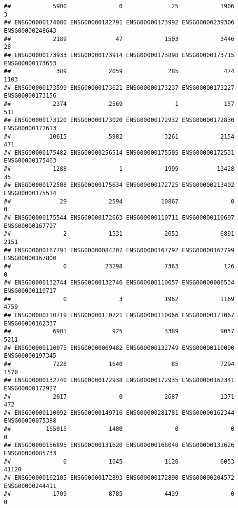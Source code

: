\documentclass[
]{article}
\begin{document}
\begin{verbatim}
##            5900               0              25            1906               3 
## ENSG00000174080 ENSG00000182791 ENSG00000173992 ENSG00000239306 ENSG00000248643 
##            2189              47            1503            3446              28 
## ENSG00000173933 ENSG00000173914 ENSG00000173898 ENSG00000173715 ENSG00000173653 
##             389            2059             285             474            1103 
## ENSG00000173599 ENSG00000173621 ENSG00000173237 ENSG00000173227 ENSG00000173156 
##            2374            2569               1             157             511 
## ENSG00000173120 ENSG00000173020 ENSG00000172932 ENSG00000172830 ENSG00000172613 
##           10615            5982            3261            2154             471 
## ENSG00000175482 ENSG00000256514 ENSG00000175505 ENSG00000172531 ENSG00000175463 
##            1288               1            1999           13428              35 
## ENSG00000172508 ENSG00000175634 ENSG00000172725 ENSG00000213402 ENSG00000175514 
##              29            2594           10867               0               0 
## ENSG00000175544 ENSG00000172663 ENSG00000110711 ENSG00000110697 ENSG00000167797 
##               2            1531            2653            6891            2151 
## ENSG00000167791 ENSG00000084207 ENSG00000167792 ENSG00000167799 ENSG00000167800 
##               0           23298            7363             126               0 
## ENSG00000132744 ENSG00000132746 ENSG00000110057 ENSG00000006534 ENSG00000110717 
##               0               3            1962            1169            4759 
## ENSG00000110719 ENSG00000110721 ENSG00000110066 ENSG00000171067 ENSG00000162337 
##            6901             925            3389            9057            5211 
## ENSG00000110075 ENSG00000069482 ENSG00000132749 ENSG00000110090 ENSG00000197345 
##            7228            1640              85            7294            1570 
## ENSG00000132740 ENSG00000172938 ENSG00000172935 ENSG00000162341 ENSG00000172927 
##            2017               0            2687            1371             472 
## ENSG00000110092 ENSG00000149716 ENSG00000281781 ENSG00000162344 ENSG00000075388 
##          165015            1480               0               0               0 
## ENSG00000186895 ENSG00000131620 ENSG00000168040 ENSG00000131626 ENSG00000085733 
##               0            1045            1120            6053           41120 
## ENSG00000162105 ENSG00000172893 ENSG00000172890 ENSG00000204572 ENSG00000244411 
##            1709            8785            4439               0               0 

\end{verbatim}
\end{document}
